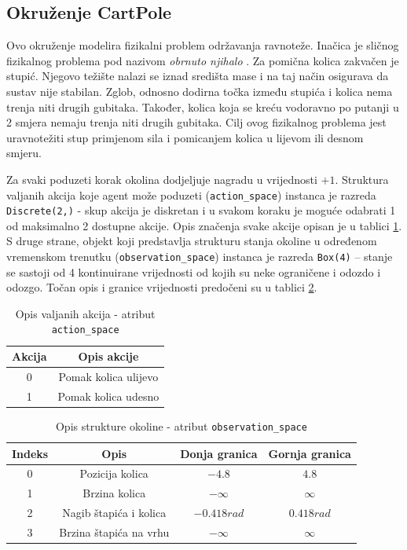 \subsection{Okruženje CartPole}

Ovo okruženje modelira fizikalni problem održavanja ravnoteže. Inačica je sličnog fizikalnog problema pod nazivom \textit{obrnuto njihalo} . Za pomična kolica zakvačen je stupić. Njegovo težište nalazi se iznad središta mase i na taj način osigurava da sustav nije stabilan.  Zglob, odnosno dodirna točka između stupića i kolica nema trenja niti drugih gubitaka. Također, kolica koja se kreću vodoravno po putanji u 2 smjera nemaju trenja niti drugih gubitaka. Cilj ovog fizikalnog problema jest uravnotežiti stup primjenom sila i pomicanjem kolica u lijevom ili desnom smjeru.

Za svaki poduzeti korak okolina dodjeljuje nagradu u vrijednosti $+1$. Struktura valjanih akcija koje agent može poduzeti (\texttt{action_space}) instanca je razreda \texttt{Discrete(2,)} - skup akcija je diskretan i u svakom koraku je moguće odabrati 1 od maksimalno 2 dostupne akcije. Opis značenja svake akcije opisan je u tablici \ref{table:cart-pole-action}. S druge strane, objekt koji predstavlja strukturu stanja okoline u određenom vremenskom trenutku (\texttt{observation_space}) instanca je razreda \texttt{Box(4)} – stanje se sastoji od 4 kontinuirane vrijednosti od kojih su neke ograničene i odozdo i odozgo. Točan opis i granice vrijednosti predočeni su u tablici \ref{table:cart-pole-observation}.

\begin{table}[ht]
    \centering
    \caption{Opis valjanih akcija - atribut \texttt{action_space}}
    \begin{tabular}{c c}
        \hline
        Akcija & Opis akcije  \\
        \hline
        0 & Pomak kolica ulijevo \\
        1 & Pomak kolica udesno \\ 
    \end{tabular}
    \label{table:cart-pole-action}
\end{table}

\begin{table}[ht]
    \centering
    \caption{Opis strukture okoline - atribut \texttt{observation_space}}
    \begin{tabular}{c c c c}
        \hline
        Indeks & Opis & Donja granica & Gornja granica \\
        \hline
        0 & Pozicija kolica & $-4.8$ & $4.8$ \\
        1 & Brzina kolica & $-\infty$ & $\infty$ \\ 
        2 & Nagib štapića i kolica & $-0.418 rad$ & $0.418 rad$ \\
        3 & Brzina štapića na vrhu & $-\infty$ & $\infty$ \\
    \end{tabular}
    \label{table:cart-pole-observation}
\end{table}

